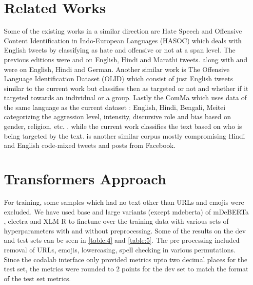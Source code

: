 \documentclass[10pt, a4paper]{article}
\begin{document}
\section{Related Works}

Some of the existing works in a similar direction are Hate Speech and Offensive Content Identification
in Indo-European Languages (HASOC) \citep{masud2023overview} which deals with English tweets by classifying as hate and offensive or not at a span level. The previous editions were \citep{ranasinghe2022overview} and \citep{mandl2021overview}  on English, Hindi and Marathi tweets. along with \citep{mandla2021overview} and \citep{10.1145/3368567.3368584} were on English, Hindi and German. Another similar work is The Offensive Language Identification Dataset (OLID) \citep{uglow2019exploration} which consist of just English tweets similar to the current work but classifies then as targeted or not and whether if it targeted towards an individual or a group. Lastly the ComMa \citep{kumar-etal-2022-comma} which uses data of the same language as the current dataset : English, Hindi, Bengali, Meitei categorizing the aggression level, intensity, discursive role and bias based on gender, religion, etc. , while the current work classifies the text based on who is being targeted by the text. \citep{kumar2018aggressionannotated} is another similar corpus mostly compromising Hindi and English code-mixed tweets and posts from Facebook. 

\section{Transformers Approach} 

For training, some samples which had no text other than URLs and emojis were excluded. We have used base and large variants (except mdeberta) of mDeBERTa \citep{he2023debertav3}, electra \citep{clark2020electra} and XLM-R \citep{conneau2020unsupervised} to finetune over the training data with various sets of hyperparameters with and without preprocessing. Some of the results on the dev and test sets can be seen in \autoref{table:4} and \autoref{table:5}. The pre-processing included removal of URLs, emojis, lowercasing, spell checking in various permutations. Since the codalab interface only provided metrics upto two decimal places for the test set, the metrics were rounded to 2 points for the dev set to match the format of the test set metrics.
\end{document}
